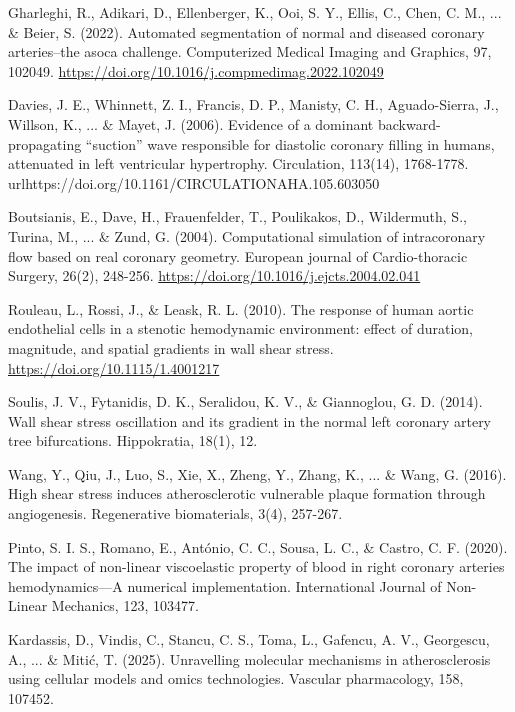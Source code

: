 ﻿\documentclass[12pt,a4paper]{article}
\theoremstyle{definition}
\numberwithin{equation}{section}
\begin{document}
\begin{thebibliography}{}
 Gharleghi, R., Adikari, D., Ellenberger, K., Ooi, S. Y., Ellis, C., Chen, C. M., ... \& Beier, S. (2022). Automated segmentation of normal and diseased coronary arteries–the asoca challenge. Computerized Medical Imaging and Graphics, 97, 102049. \url{https://doi.org/10.1016/j.compmedimag.2022.102049}

 Davies, J. E., Whinnett, Z. I., Francis, D. P., Manisty, C. H., Aguado-Sierra, J., Willson, K., ... \& Mayet, J. (2006). Evidence of a dominant backward-propagating “suction” wave responsible for diastolic coronary filling in humans, attenuated in left ventricular hypertrophy. Circulation, 113(14), 1768-1778. \\url{https://doi.org/10.1161/CIRCULATIONAHA.105.603050}

 Boutsianis, E., Dave, H., Frauenfelder, T., Poulikakos, D., Wildermuth, S., Turina, M., ... \& Zund, G. (2004). Computational simulation of intracoronary flow based on real coronary geometry. European journal of Cardio-thoracic Surgery, 26(2), 248-256. \url{https://doi.org/10.1016/j.ejcts.2004.02.041}

 Rouleau, L., Rossi, J., \& Leask, R. L. (2010). The response of human aortic endothelial cells in a stenotic hemodynamic environment: effect of duration, magnitude, and spatial gradients in wall shear stress. \url{https://doi.org/10.1115/1.4001217}

 Soulis, J. V., Fytanidis, D. K., Seralidou, K. V., \& Giannoglou, G. D. (2014). Wall shear stress oscillation and its gradient in the normal left coronary artery tree bifurcations. Hippokratia, 18(1), 12.

 Wang, Y., Qiu, J., Luo, S., Xie, X., Zheng, Y., Zhang, K., ... \& Wang, G. (2016). High shear stress induces atherosclerotic vulnerable plaque formation through angiogenesis. Regenerative biomaterials, 3(4), 257-267.

 Pinto, S. I. S., Romano, E., António, C. C., Sousa, L. C., \& Castro, C. F. (2020). The impact of non-linear viscoelastic property of blood in right coronary arteries hemodynamics—A numerical implementation. International Journal of Non-Linear Mechanics, 123, 103477.

  Kardassis, D., Vindis, C., Stancu, C. S., Toma, L., Gafencu, A. V., Georgescu, A., ... \& Mitić, T. (2025). Unravelling molecular mechanisms in atherosclerosis using cellular models and omics technologies. Vascular pharmacology, 158, 107452.


\end{thebibliography}
\end{document}
